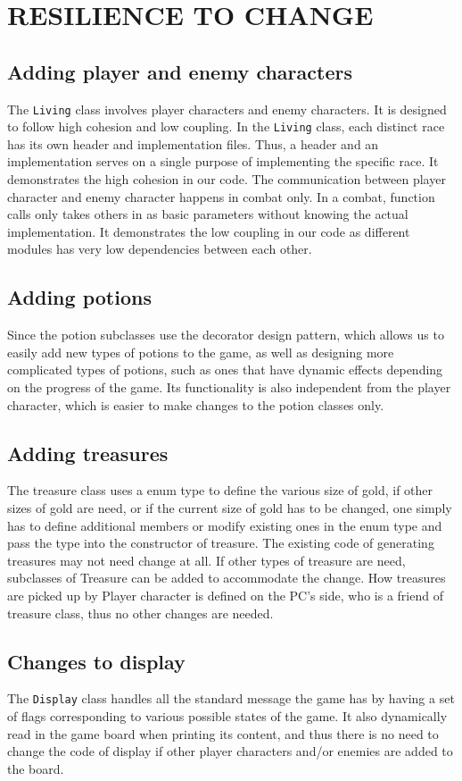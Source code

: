 \documentclass[11pt]{article}
\theoremstyle{plain} \newtheorem{theorem*}{Theorem}[subsection]
\begin{document}
\section{RESILIENCE TO CHANGE}
\subsection{Adding player and enemy characters}
The \texttt{Living} class involves player characters and enemy characters. 
It is designed to follow high cohesion and low coupling. 
In the \texttt{Living} class, each distinct race has its own header and 
implementation files. Thus, a header and an
implementation serves on a single purpose of implementing the specific race. It
demonstrates the high cohesion in our code. The communication between player
character and enemy character happens in combat only. In a combat, function
calls only takes others in as basic parameters without knowing the actual
implementation. It demonstrates the low coupling in our code as different
modules has very low dependencies between each other. 

\subsection{Adding potions}
Since the potion subclasses use the decorator design pattern, which allows us
to easily add new types of potions to the game, as well as designing more
complicated types of potions, such as ones that have dynamic effects depending
on the progress of the game. Its functionality is also independent from the
player character, which is easier to make changes to the potion classes only. 

\subsection{Adding treasures}
The treasure class uses a enum type to define the various size of gold, if
other sizes of gold are need, or if the current size of gold has to be changed,
one simply has to define additional members or modify existing ones in the enum
type and pass the type into the constructor of treasure. The existing code of
generating treasures may not need change at all. If other types of treasure are
need, subclasses of Treasure can be added to accommodate the change. How
treasures are picked up by Player character is defined on the PC’s side, who is
a friend of treasure class, thus no other changes are needed. 

\subsection{Changes to display}
The \texttt{Display} class handles all the standard message the game has by 
having a set
of flags corresponding to various possible states of the game. It also
dynamically read in the game board when printing its content, and thus there is
no need to change the code of display if other player characters and/or enemies
are added to the board.  
\end{document}
